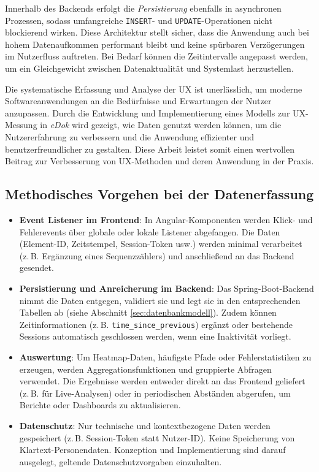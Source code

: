 \documentclass[12pt,oneside]{article}
\begin{document}
Innerhalb des Backends erfolgt die \emph{Persistierung} ebenfalls in asynchronen Prozessen, sodass umfangreiche \texttt{INSERT}- und \texttt{UPDATE}-Operationen nicht blockierend wirken. Diese Architektur stellt sicher, dass die Anwendung auch bei hohem Datenaufkommen performant bleibt und keine spürbaren Verzögerungen im Nutzerfluss auftreten. Bei Bedarf können die Zeitintervalle angepasst werden, um ein Gleichgewicht zwischen Datenaktualität und Systemlast herzustellen.

 

Die systematische Erfassung und Analyse der UX ist unerlässlich, um moderne Softwareanwendungen an die Bedürfnisse und Erwartungen der Nutzer anzupassen. Durch die Entwicklung und Implementierung eines Modells zur UX-Messung in \textit{eDok} wird gezeigt, wie Daten genutzt werden können, um die Nutzererfahrung zu verbessern und die Anwendung effizienter und benutzerfreundlicher zu gestalten. Diese Arbeit leistet somit einen wertvollen Beitrag zur Verbesserung von UX-Methoden und deren Anwendung in der Praxis.


\subsection{Methodisches Vorgehen bei der Datenerfassung}

\begin{itemize}
    \item \textbf{Event Listener im Frontend}: In Angular-Komponenten werden Klick- und Fehlerevents über globale oder lokale Listener abgefangen. Die Daten (Element-ID, Zeitstempel, Session-Token usw.) werden minimal verarbeitet (z.\,B. Ergänzung eines Sequenzzählers) und anschließend an das Backend gesendet.
    \item \textbf{Persistierung und Anreicherung im Backend}: Das Spring-Boot-Backend nimmt die Daten entgegen, validiert sie und legt sie in den entsprechenden Tabellen ab (siehe Abschnitt \ref{sec:datenbankmodell}). Zudem können Zeitinformationen (z.\,B. \texttt{time\_since\_previous}) ergänzt oder bestehende Sessions automatisch geschlossen werden, wenn eine Inaktivität vorliegt.
    \item \textbf{Auswertung}: Um Heatmap-Daten, häufigste Pfade oder Fehlerstatistiken zu erzeugen, werden Aggregationsfunktionen und gruppierte Abfragen verwendet. Die Ergebnisse werden entweder direkt an das Frontend geliefert (z.\,B. für Live-Analysen) oder in periodischen Abständen abgerufen, um Berichte oder Dashboards zu aktualisieren.
    \item \textbf{Datenschutz}: Nur technische und kontextbezogene Daten werden gespeichert (z.\,B. Session-Token statt Nutzer-ID). Keine Speicherung von Klartext-Personendaten. Konzeption und Implementierung sind darauf ausgelegt, geltende Datenschutzvorgaben einzuhalten.
\end{itemize}
\end{document}
